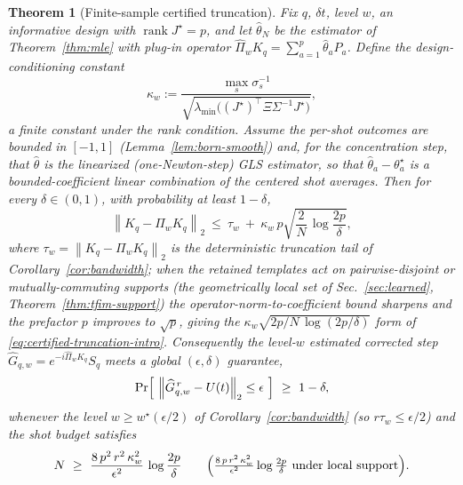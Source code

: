 \documentclass[aps,prresearch,reprint,superscriptaddress,nofootinbib,amsmath,amssymb]{revtex4-2}
\newcommand{\norm}[1]{\left\lVert #1 \right\rVert}
\newcommand{\dt}{\delta t}
\newtheorem{theorem}{Theorem}
\begin{document}
\begin{theorem}[Finite-sample certified truncation]
\label{thm:certified-truncation}
Fix $q$, $\dt$, level $w$, an informative design with $\operatorname{rank}J^\star=p$, and let $\hat\theta_N$ be the estimator of Theorem~\ref{thm:mle} with plug-in operator $\widehat\Pi_wK_q=\sum_{a=1}^{p}\hat\theta_aP_a$. Define the design-conditioning constant
\begin{equation}
    \kappa_w:=\frac{\max_s\sigma_s^{-1}}{\sqrt{\lambda_{\min}\!\bigl((J^\star)^\top\Xi\Sigma^{-1}J^\star\bigr)}},
    \label{eq:kappa}
\end{equation}
a finite constant under the rank condition. Assume the per-shot outcomes are bounded in $[-1,1]$ (Lemma~\ref{lem:born-smooth}) and, for the concentration step, that $\hat\theta$ is the linearized (one-Newton-step) GLS estimator, so that $\hat\theta_a-\theta_a^\star$ is a bounded-coefficient linear combination of the centered shot averages. Then for every $\delta\in(0,1)$, with probability at least $1-\delta$,
\begin{equation}
    \norm{K_q-\widehat\Pi_wK_q}_2\ \le\ \tau_w\ +\ \kappa_w\,p\sqrt{\frac{2}{N}\,\log\frac{2p}{\delta}},
    \label{eq:certified-truncation}
\end{equation}
where $\tau_w=\norm{K_q-\Pi_wK_q}_2$ is the deterministic truncation tail of Corollary~\ref{cor:bandwidth}; when the retained templates act on pairwise-disjoint or mutually-commuting supports (the geometrically local set of Sec.~\ref{sec:learned}, Theorem~\ref{thm:tfim-support}) the operator-norm-to-coefficient bound sharpens and the prefactor $p$ improves to $\sqrt p$, giving the $\kappa_w\sqrt{2p/N\,\log(2p/\delta)}$ form of \eqref{eq:certified-truncation-intro}. Consequently the level-$w$ estimated corrected step $\widehat G_{q,w}=e^{-i\widehat\Pi_wK_q}S_q$ meets a global $(\epsilon,\delta)$ guarantee,
\begin{equation}
    \Pr\Bigl[\ \norm{\widehat G_{q,w}^{\,r}-U(t)}_2\le\epsilon\ \Bigr]\ \ge\ 1-\delta,
    \label{eq:certified-global}
\end{equation}
whenever the level $w\geq w^\star(\epsilon/2)$ of Corollary~\ref{cor:bandwidth} (so $r\tau_w\leq\epsilon/2$) and the shot budget satisfies
\begin{equation}
    N\ \geq\ \frac{8\,p^2\,r^2\,\kappa_w^2}{\epsilon^2}\,\log\frac{2p}{\delta}
    \qquad\Bigl(\tfrac{8\,p\,r^2\,\kappa_w^2}{\epsilon^2}\log\tfrac{2p}{\delta}\ \text{under local support}\Bigr).
    \label{eq:shot-budget}
\end{equation}
\end{theorem}
\end{document}
